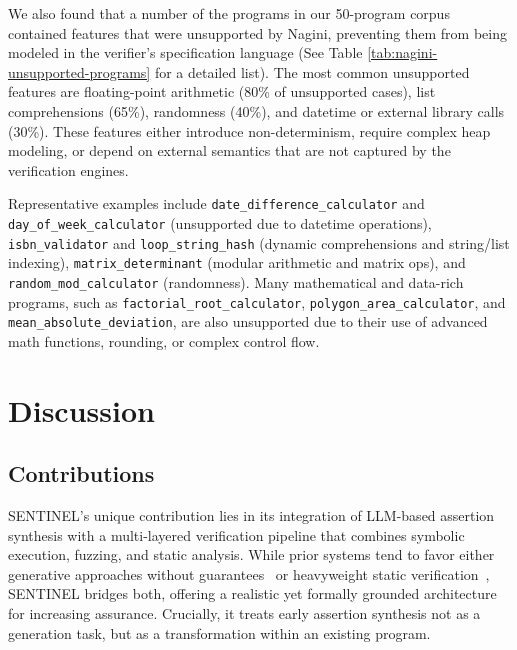 \documentclass[8pt]{extarticle}
\begin{document}
We also found that a number of the programs in our 50-program corpus contained features that were unsupported by Nagini, preventing them from being modeled in the verifier's specification language (See Table \ref{tab:nagini-unsupported-programs} for a detailed list). The most common unsupported features are floating-point arithmetic (80\% of unsupported cases), list comprehensions (65\%), randomness (40\%), and datetime or external library calls (30\%). These features either introduce non-determinism, require complex heap modeling, or depend on external semantics that are not captured by the verification engines.

Representative examples include \texttt{date\_difference\_calculator} and \texttt{day\_of\_week\_calculator} (unsupported due to datetime operations), \texttt{isbn\_validator} and \texttt{loop\_string\_hash} (dynamic comprehensions and string/list indexing), \texttt{matrix\_determinant} (modular arithmetic and matrix ops), and \texttt{random\_mod\_calculator} (randomness). Many mathematical and data-rich programs, such as \texttt{factorial\_root\_calculator}, \texttt{polygon\_area\_calculator}, and \texttt{mean\_absolute\_deviation}, are also unsupported due to their use of advanced math functions, rounding, or complex control flow.

\section{Discussion}

\subsection{Contributions}
SENTINEL's unique contribution lies in its integration of LLM-based assertion synthesis with a multi-layered verification pipeline that combines symbolic execution, fuzzing, and static analysis. While prior systems tend to favor either generative approaches without guarantees~\cite{Torkamani2024-Assertify, watson2020} or heavyweight static verification~\cite{eilers2018}, SENTINEL bridges both, offering a realistic yet formally grounded architecture for increasing assurance. Crucially, it treats early assertion synthesis not as a generation task, but as a transformation within an existing program.
\end{document}
